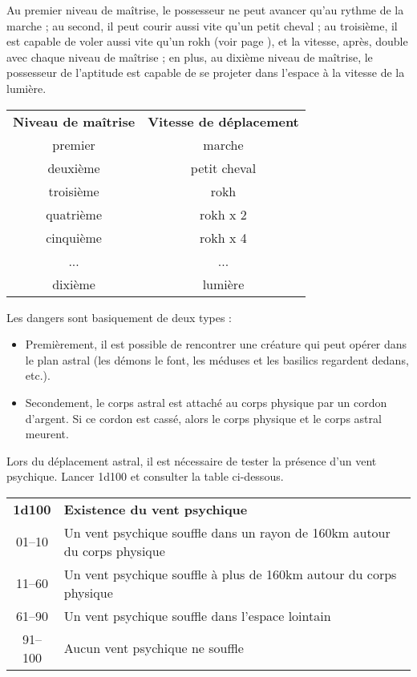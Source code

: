 \bigskip

Au premier niveau de maîtrise, le possesseur ne peut avancer qu'au rythme de la marche ; au second, il peut courir aussi vite qu'un petit cheval ; au troisième, il est capable de voler aussi vite qu'un rokh (voir page \pageref{monstre-rokh}), et la vitesse, après, double avec chaque niveau de maîtrise ; en plus, au dixième niveau de maîtrise, le possesseur de l'aptitude est capable de se projeter dans l'espace à la vitesse de la lumière.

\bigskip
\begin{tabular}{cc}
\textbf{Niveau de maîtrise} & \textbf{Vitesse de déplacement} \\
premier     & marche \\
deuxième    & petit cheval \\
troisième   & rokh \\
quatrième   & rokh x 2 \\
cinquième   & rokh x 4 \\
...         & ... \\
dixième     & lumière \\
\end{tabular}

\bigskip

Les dangers sont basiquement de deux types :

\bigskip

\begin{itemize}
\item Premièrement, il est possible de rencontrer une créature qui peut opérer dans le plan astral (les démons le font, les méduses et les basilics regardent dedans, etc.).
\item Secondement, le corps astral est attaché au corps physique par un cordon d'argent. Si ce cordon est cassé, alors le corps physique et le corps astral meurent.
\end{itemize}

\bigskip

Lors du déplacement astral, il est nécessaire de tester la présence d'un vent psychique. Lancer 1d100 et consulter la table ci-dessous.

\bigskip

\begin{tabular}{cl}
\textbf{1d100} & \textbf{Existence du vent psychique} \\
01--10 & Un vent psychique souffle dans un rayon de 160km autour du corps physique \\
11--60 & Un vent psychique souffle à plus de 160km autour du corps physique \\
61--90 & Un vent psychique souffle dans l'espace lointain \\
91--100 & Aucun vent psychique ne souffle \\
\end{tabular}

